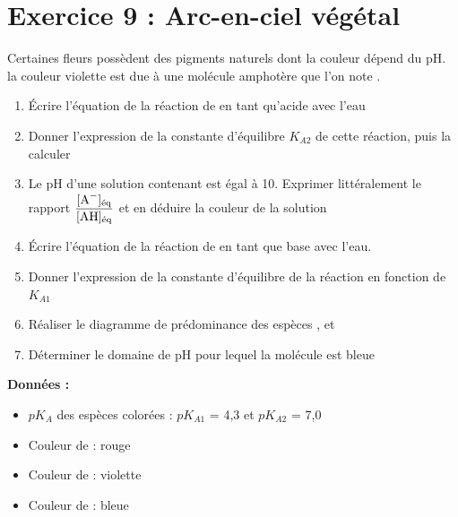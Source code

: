 \documentclass[a4paper,12pt]{article}
\begin{document}
\section*{Exercice 9 : Arc-en-ciel végétal}
Certaines fleurs possèdent des pigments naturels dont la couleur dépend du pH. la couleur violette est due à une molécule amphotère que l'on note .
\begin{enumerate}
	\item Écrire l'équation de la réaction de  en tant qu'acide avec l'eau
	\item Donner l'expression de la constante d'équilibre $K_{A2}$ de cette réaction, puis la calculer
	\item Le pH d'une solution contenant  est égal à 10. Exprimer littéralement le rapport $\dfrac{[\ce{A-}]_{\text{éq}}}{[\ce{AH}]_{\text{éq}}}$ et en déduire la couleur de la solution
	\item Écrire l'équation de la réaction de  en tant que base avec l'eau.
	\item Donner l'expression de la constante d'équilibre de la réaction en fonction de $K_{A1}$
	\item Réaliser le diagramme de prédominance des espèces ,  et 
	\item Déterminer le domaine de pH pour lequel la molécule est bleue
\end{enumerate}
\textbf{Données :}
\begin{itemize}
	\item $pK_A$ des espèces colorées : $pK_{A1}$ = 4,3 et $pK_{A2}$ = 7,0
	\item Couleur de  : rouge
	\item Couleur de  : violette
	\item Couleur de  : bleue
\end{itemize}
\end{document}
